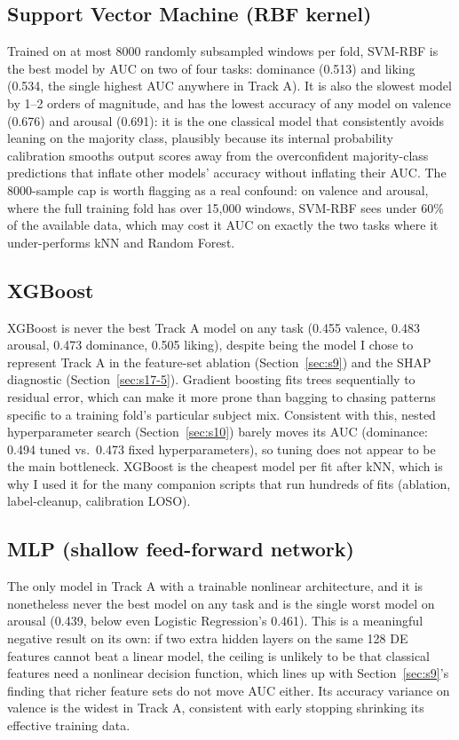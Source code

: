 \documentclass[11pt]{report}
\begin{document}
\subsection{Support Vector Machine (RBF kernel)}
Trained on at most 8000 randomly subsampled windows per fold, SVM-RBF is
the best model by AUC on two of four tasks: dominance (0.513) and liking
(0.534, the single highest AUC anywhere in Track A). It is also the
slowest model by 1--2 orders of magnitude, and has the lowest accuracy of
any model on valence (0.676) and arousal (0.691): it is the one classical
model that consistently avoids leaning on the majority class, plausibly
because its internal probability calibration smooths output scores away
from the overconfident majority-class predictions that inflate other
models' accuracy without inflating their AUC. The 8000-sample cap is worth
flagging as a real confound: on valence and arousal, where the full
training fold has over 15{,}000 windows, SVM-RBF sees under 60\% of the
available data, which may cost it AUC on exactly the two tasks where it
under-performs kNN and Random Forest.

\subsection{XGBoost}
\label{sec:ma-xgb}
XGBoost is never the best Track A model on any task (0.455 valence, 0.483
arousal, 0.473 dominance, 0.505 liking), despite being the model I chose to
represent Track A in the feature-set ablation (Section~\ref{sec:s9}) and
the SHAP diagnostic (Section~\ref{sec:s17-5}). Gradient boosting fits trees
sequentially to residual error, which can make it more prone than bagging
to chasing patterns specific to a training fold's particular subject mix.
Consistent with this, nested hyperparameter search (Section~\ref{sec:s10})
barely moves its AUC (dominance: 0.494 tuned vs.\ 0.473 fixed
hyperparameters), so tuning does not appear to be the main bottleneck.
XGBoost is the cheapest model per fit after kNN, which is why I used it for
the many companion scripts that run hundreds of fits (ablation,
label-cleanup, calibration LOSO).

\subsection{MLP (shallow feed-forward network)}
The only model in Track A with a trainable nonlinear architecture, and it
is nonetheless never the best model on any task and is the single worst
model on arousal (0.439, below even Logistic Regression's 0.461). This is a
meaningful negative result on its own: if two extra hidden layers on the
same 128 DE features cannot beat a linear model, the ceiling is unlikely to
be that classical features need a nonlinear decision function, which lines
up with Section~\ref{sec:s9}'s finding that richer feature sets do not move
AUC either. Its accuracy variance on valence is the widest in Track A,
consistent with early stopping shrinking its effective training data.
\end{document}
